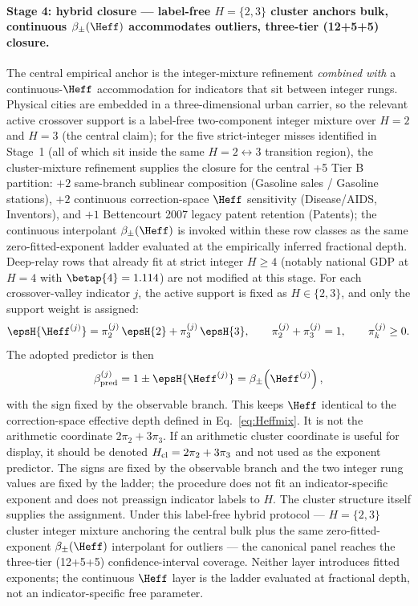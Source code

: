\paragraph{Stage 4: hybrid closure --- label-free \(H{=}\{2,3\}\) cluster anchors bulk, continuous \(\beta_{\pm}(\Heff)\) accommodates outliers, three-tier (12+5+5) closure.}
The central empirical anchor is the integer-mixture refinement \emph{combined with} a continuous-\(\Heff\) accommodation for indicators that sit between integer rungs. Physical
cities are embedded in a three-dimensional urban carrier, so the relevant
active crossover support is a label-free two-component integer mixture over
\(H=2\) and \(H=3\) (the central claim); for the five strict-integer
misses identified in Stage~1 (all of which sit inside the same
\(H{=}2{\leftrightarrow}3\) transition region), the cluster-mixture refinement supplies the closure for the central +5 Tier B partition: $+2$ same-branch sublinear composition (Gasoline sales / Gasoline stations), $+2$ continuous correction-space \(\Heff\) sensitivity (Disease/AIDS, Inventors), and $+1$ Bettencourt 2007 legacy patent retention (Patents); the continuous interpolant \(\beta_{\pm}(\Heff)\) is invoked within these row classes as the same zero-fitted-exponent ladder evaluated at the empirically inferred fractional depth. Deep-relay rows that already
fit at strict integer \(H{\geq}4\) (notably national GDP at \(H{=}4\) with
\(\betap{4}=1.114\)) are not modified at this stage. For each crossover-valley indicator \(j\), the active support is fixed as \(H\in\{2,3\}\), and only the support weight is assigned:
\[
\epsH{\Heff^{(j)}}=
\pi_2^{(j)}\,\epsH{2}+\pi_3^{(j)}\,\epsH{3},
\qquad
\pi_2^{(j)}+\pi_3^{(j)}=1,\qquad
\pi_k^{(j)}\ge 0.
\]
The adopted predictor is then
\[
\beta_{\mathrm{pred}}^{(j)}
=
1\pm \epsH{\Heff^{(j)}}
=
\beta_{\pm}\!\left(\Heff^{(j)}\right),
\]
with the sign fixed by the observable branch. This keeps \(\Heff\) identical to the correction-space effective depth defined in Eq.~\eqref{eq:Heffmix}. It is not the arithmetic coordinate \(2\pi_2+3\pi_3\). If an arithmetic cluster coordinate is useful for display, it should be denoted \(H_{\rm cl}=2\pi_2+3\pi_3\) and not used as the exponent predictor.
The signs are fixed by the observable branch and the two integer rung values
are fixed by the ladder; the procedure does not fit an indicator-specific
exponent and does not preassign indicator labels to \(H\). The cluster
structure itself supplies the assignment. Under this label-free hybrid
protocol --- \(H{=}\{2,3\}\) cluster integer mixture anchoring the central bulk plus
the same zero-fitted-exponent \(\beta_{\pm}(\Heff)\) interpolant for outliers ---
the canonical panel reaches the three-tier (12+5+5) confidence-interval coverage. Neither
layer introduces fitted exponents; the continuous \(\Heff\) layer is the
ladder evaluated at fractional depth, not an indicator-specific free parameter.

